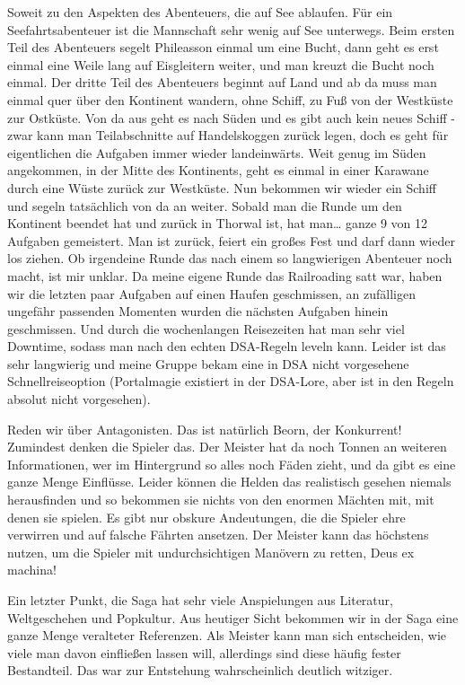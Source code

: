 \documentclass[final]{multiversum}
\begin{document}
Soweit zu den Aspekten des Abenteuers, die auf See ablaufen. Für ein
Seefahrtsabenteuer ist die Mannschaft sehr wenig auf See unterwegs. Beim ersten
Teil des Abenteuers segelt Phileasson einmal um eine Bucht, dann geht es erst
einmal eine Weile lang auf Eisgleitern weiter, und man kreuzt die Bucht noch
einmal. Der dritte Teil des Abenteuers beginnt auf Land und ab da muss man
einmal quer über den Kontinent wandern, ohne Schiff, zu Fuß von der Westküste
zur Ostküste. Von da aus geht es nach Süden und es gibt auch kein neues Schiff -
zwar kann man Teilabschnitte auf Handelskoggen zurück legen, doch es geht für
eigentlichen die Aufgaben immer wieder landeinwärts. Weit genug im Süden
angekommen, in der Mitte des Kontinents, geht es einmal in einer Karawane durch
eine Wüste zurück zur Westküste. Nun bekommen wir wieder ein Schiff und segeln
tatsächlich von da an weiter. Sobald man die Runde um den Kontinent beendet hat
und zurück in Thorwal ist, hat man… ganze 9 von 12 Aufgaben gemeistert. Man ist
zurück, feiert ein großes Fest und darf dann wieder los ziehen. Ob irgendeine
Runde das nach einem so langwierigen Abenteuer noch macht, ist mir unklar. Da
meine eigene Runde das Railroading satt war, haben wir die letzten paar Aufgaben
auf einen Haufen geschmissen, an zufälligen ungefähr passenden Momenten wurden
die nächsten Aufgaben hinein geschmissen. Und durch die wochenlangen Reisezeiten
hat man sehr viel Downtime, sodass man nach den echten DSA-Regeln leveln kann.
Leider ist das sehr langwierig und meine Gruppe bekam eine in DSA nicht
vorgesehene Schnellreiseoption (Portalmagie existiert in der DSA-Lore, aber ist
in den Regeln absolut nicht vorgesehen).

Reden wir über Antagonisten. Das ist natürlich Beorn, der Konkurrent! Zumindest
denken die Spieler das. Der Meister hat da noch Tonnen an weiteren
Informationen, wer im Hintergrund so alles noch Fäden zieht, und da gibt es eine
ganze Menge Einflüsse. Leider können die Helden das realistisch gesehen niemals
herausfinden und so bekommen sie nichts von den enormen Mächten mit, mit denen
sie spielen. Es gibt nur obskure Andeutungen, die die Spieler ehre verwirren und
auf falsche Fährten ansetzen. Der Meister kann das höchstens nutzen, um die
Spieler mit undurchsichtigen Manövern zu retten, Deus ex machina!

Ein letzter Punkt, die Saga hat sehr viele Anspielungen aus Literatur,
Weltgeschehen und Popkultur. Aus heutiger Sicht bekommen wir in der Saga eine
ganze Menge veralteter Referenzen. Als Meister kann man sich entscheiden, wie
viele man davon einfließen lassen will, allerdings sind diese häufig fester
Bestandteil. Das war zur Entstehung wahrscheinlich deutlich witziger.
\end{document}
